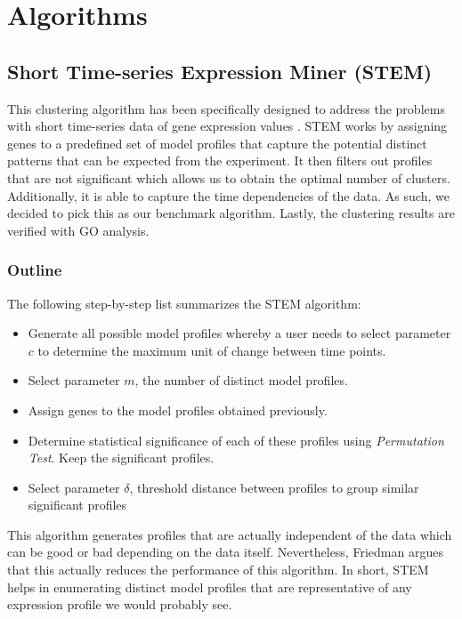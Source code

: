 
\chapter{Algorithms}
\setlength{\belowdisplayskip}{1pt} \setlength{\belowdisplayshortskip}{1pt}
\setlength{\abovedisplayskip}{1pt} \setlength{\abovedisplayshortskip}{1pt}
\section{Short Time-series Expression Miner (STEM)} \label{3.1}
This clustering algorithm has been specifically designed to address the problems with short time-series data of gene expression values \cite{Ernst2005}. STEM works by assigning genes to a predefined set of model profiles that capture the potential distinct patterns that can be expected from the experiment. It then filters out profiles that are not significant which allows us to obtain the optimal number of clusters. Additionally, it is able to capture the time dependencies of the data. As such, we decided to pick this as our benchmark algorithm. Lastly, the clustering results are verified with GO analysis. 

\subsection{Outline}
The following step-by-step list summarizes the STEM algorithm:
	\begin{itemize}
		\item Generate all possible model profiles whereby a user needs to select parameter $c$ to determine the maximum unit of change between time points.
		\item Select parameter $m$, the number of distinct model profiles.
		\item Assign genes to the model profiles obtained previously.
		\item Determine statistical significance of each of these profiles using \textit{Permutation Test}. Keep the significant profiles.
		\item Select parameter $\delta$, threshold distance between profiles to group similar significant profiles
	\end{itemize}
This algorithm generates profiles that are actually independent of the data which can be good or bad depending on the data itself. Nevertheless, Friedman \cite{Sivriver2011} argues that this actually reduces the performance of this algorithm. In short, STEM helps in enumerating distinct model profiles that are representative of any expression profile we would probably see.

